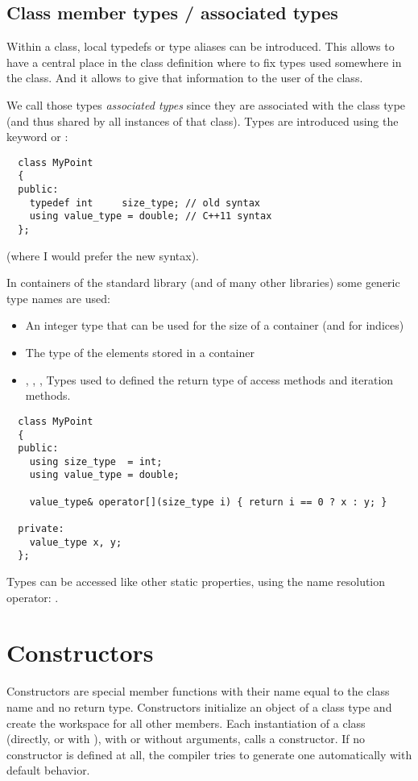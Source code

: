 \subsection{Class member types / associated types}
Within a class, local typedefs or type aliases can be introduced. This allows to have a central place in the class definition where to fix types used
somewhere in the class. And it allows to give that information to the user of the class.

We call those types \emph{associated types} since they are associated with the class type (and thus shared by all instances of that class). Types
are introduced using the keyword  or :
%
\begin{verbatim}
  class MyPoint
  {
  public:
    typedef int     size_type; // old syntax
    using value_type = double; // C++11 syntax
  };
\end{verbatim}
(where I would prefer the new syntax).

In containers of the standard library (and of many other libraries) some generic type names are used:
\begin{itemize}
  \item {} An integer type that can be used for the size of a container (and for indices)
  \item {} The type of the elements stored in a container
  \item {}, , ,  Types used to defined the return type of access methods and iteration methods.
\end{itemize}
%
\begin{verbatim}
  class MyPoint
  {
  public:
    using size_type  = int;
    using value_type = double;

    value_type& operator[](size_type i) { return i == 0 ? x : y; }

  private:
    value_type x, y;
  };
\end{verbatim}

Types can be accessed like other static properties, using the name resolution operator: .


\section{Constructors\label{sec:constructor}}
Constructors are special member functions with their name equal to the class name and no return type. Constructors initialize an object of a class type
and create the workspace for all other members. Each instantiation of a class (directly, or with ), with or without arguments, calls a constructor.
If no constructor is defined at all, the compiler tries to generate one automatically with default behavior.

